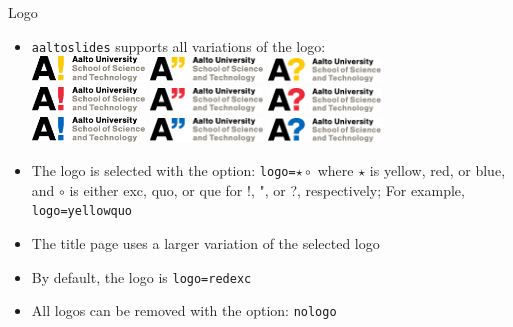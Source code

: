 \documentclass[first=red,second=purple,logo=yellowexc]{aaltoslides}
\begin{document}
\begin{frame}{Logo}

\begin{itemize}
\item \texttt{aaltoslides} supports all variations of the logo:\\[0.2cm]
\includegraphics[width=3cm]{Aalto_EN_ScienceandTech_13_RGB_y1.pdf} \hspace{10pt}
\includegraphics[width=3cm]{Aalto_EN_ScienceandTech_13_RGB_y2.pdf} \hspace{10pt}
\includegraphics[width=3cm]{Aalto_EN_ScienceandTech_13_RGB_y3.pdf} \\[0.2cm]
\includegraphics[width=3cm]{Aalto_EN_ScienceandTech_13_RGB_r1.pdf} \hspace{10pt}
\includegraphics[width=3cm]{Aalto_EN_ScienceandTech_13_RGB_r2.pdf} \hspace{10pt}
\includegraphics[width=3cm]{Aalto_EN_ScienceandTech_13_RGB_r3.pdf} \\[0.2cm]
\includegraphics[width=3cm]{Aalto_EN_ScienceandTech_13_RGB_b1.pdf} \hspace{10pt}
\includegraphics[width=3cm]{Aalto_EN_ScienceandTech_13_RGB_b2.pdf} \hspace{10pt}
\includegraphics[width=3cm]{Aalto_EN_ScienceandTech_13_RGB_b3.pdf} \\
\item The logo is selected with the option: \texttt{logo=$\star\circ$} where $\star$ is {\color{aaltoyellow}yellow}, {\color{aaltored}red}, or {\color{aaltoblue}blue}, and $\circ$ is either exc, quo, or que for !, ", or ?, respectively; For example, \texttt{logo=yellowquo}
\item The title page uses a larger variation of the selected logo
\item By default, the logo is \texttt{logo=redexc}
\item All logos can be removed with the option: \texttt{nologo}
\end{itemize}


\end{frame}
\end{document}
